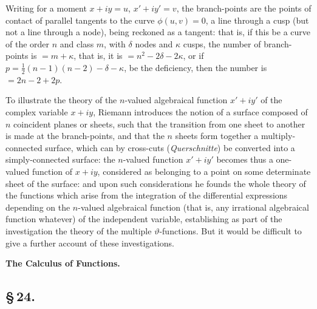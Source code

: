 \documentclass[11pt,a4paper]{book}
\begin{document}
Writing for a moment $x + iy = u$, $x' + iy' = v$, the branch-points are the points of contact of parallel tangents to the curve $\phi(u, v) = 0$, a line through a cusp (but not a line through a node), being reckoned as a tangent: that is, if this be a curve of the order $n$ and class $m$, with $\delta$ nodes and $\kappa$ cusps, the number of branch-points is $= m + \kappa$, that is, it is $= n^{2} - 2\delta - 2\kappa$, or if $p = \frac{1}{2}(n - 1)(n - 2) - \delta - \kappa$, be the deficiency, then the number is $= 2n - 2 + 2p$.

To illustrate the theory of the $n$-valued algebraical function $x' + iy'$ of the complex variable $x + iy$, Riemann introduces the notion of a surface composed of $n$ coincident planes or sheets, such that the transition from one sheet to another is made at the branch-points, and that the $n$ sheets form together a multiply-connected surface, which can by cross-cuts (\textit{Querschnitte}) be converted into a simply-connected surface: the $n$-valued function $x' + iy'$ becomes thus a one-valued function of $x + iy$, considered as belonging to a point on some determinate sheet of the surface: and upon such considerations he founds the whole theory of the functions which arise from the integration of the differential expressions depending on the $n$-valued algebraical function (that is, any irrational algebraical function whatever) of the independent variable, establishing as part of the investigation the theory of the multiple $\vartheta$-functions. But it would be difficult to give a further account of these investigations.

\smallskip
\begin{center}\textbf{The Calculus of Functions.}\end{center}

\subsection*{\S\,24.}
\end{document}
